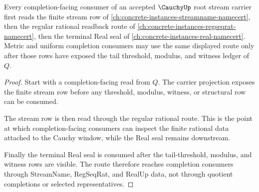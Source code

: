 \begin{theorem}
\label{thm:cauchy-root-completion-consumer-route}
Every completion-facing consumer of an accepted $\CauchyUp$ root stream carrier first reads the finite stream row of \autoref{ch:concrete-instances-streamname-namecert}, then the regular rational readback route of \autoref{ch:concrete-instances-regseqrat-namecert}, then the terminal Real seal of \autoref{ch:concrete-instances-real-namecert}. Metric and uniform completion consumers may use the same displayed route only after those rows have exposed the tail threshold, modulus, and witness ledger of $Q$.
\end{theorem}
\begin{proof}
Start with a completion-facing read from $Q$. The carrier projection exposes the finite stream row before any threshold, modulus, witness, or structural row can be consumed.

The stream row is then read through the regular rational route. This is the point at which completion-facing consumers can inspect the finite rational data attached to the Cauchy window, while the Real seal remains downstream.

Finally the terminal Real seal is consumed after the tail-threshold, modulus, and witness rows are visible. The route therefore reaches completion consumers through StreamName, RegSeqRat, and RealUp data, not through quotient completions or selected representatives.
\end{proof}
